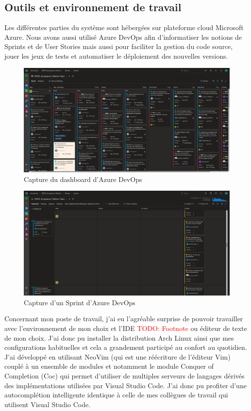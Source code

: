 \documentclass[12pt, a4paper]{report}
\makeatletter
\newcommand\tab[1][1cm]{\hspace*{#1}}
\newcommand\TODO[1]{\textcolor{red}{TODO\@: #1}}
\makeatother
\begin{document}
\subsection{Outils et environnement de travail}
\tab{}Les différentes parties du système sont hébergées sur plateforme cloud Microsoft Azure.\newline
Nous avons aussi utilisé Azure DevOps afin d'informatiser les notions de Sprints et de User Stories mais aussi pour faciliter la gestion du code source, jouer les jeux de tests et automatiser le déploiement des nouvelles versions.\newline
\begin{figure}[H]
    \centering
    \includegraphics[width=\textwidth]{dashboard_azure.png}
    \caption{Capture du dashboard d'Azure DevOps}
\end{figure}
\begin{figure}[H]
    \centering
    \includegraphics[width=\textwidth]{sprint_azure.png}
    \caption{Capture d'un Sprint d'Azure DevOps}
\end{figure}

\tab{}Concernant mon poste de travail, j'ai eu l'agréable surprise de pouvoir travailler avec l'environnement de mon choix et l'IDE \TODO{Footnote} ou éditeur de texte de mon choix. J'ai donc pu installer la distribution Arch Linux ainsi que mes configurations habituelles et cela a grandement participé au confort au quotidien. J'ai développé en utilisant NeoVim (qui est une réécriture de l'éditeur Vim) couplé à un ensemble de modules et notamment le module Conquer of Completion (Coc) qui permet d'utiliser de multiples serveurs de langages dérivés des implémentations utilisées par Visual Studio Code. J'ai donc pu profiter d'une autocomplétion intelligente identique à celle de mes collègues de travail qui utilisent Visual Studio Code.
\end{document}
